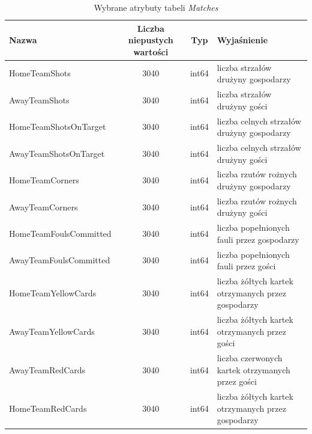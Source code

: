     \begin{table}[H]
    \caption{Wybrane atrybuty tabeli \emph{Matches}}\label{tab:matches}
    \centering\footnotesize%
    \begin{tabular}{l c c l}
    \toprule
        Nazwa & Liczba niepustych wartości & Typ & Wyjaśnienie \\
    \midrule
        HomeTeamShots & 3040 & int64 & liczba strzałów drużyny gospodarzy \\
        AwayTeamShots & 3040 & int64 & liczba strzałów drużyny gości \\
        HomeTeamShotsOnTarget & 3040 & int64 & liczba celnych strzałów drużyny gospodarzy \\
        AwayTeamShotsOnTarget & 3040 & int64 & liczba celnych strzałów drużyny gości \\
        HomeTeamCorners & 3040 & int64 & liczba rzutów rożnych drużyny gospodarzy \\
        AwayTeamCorners & 3040 & int64 & liczba rzutów rożnych drużyny gości \\
        HomeTeamFoulsCommitted & 3040 & int64 & liczba popełnionych fauli przez gospodarzy \\
        AwayTeamFoulsCommitted & 3040 & int64 & liczba popełnionych fauli przez gości \\
        HomeTeamYellowCards & 3040 & int64 & liczba żółtych kartek otrzymanych przez gospodarzy \\
        AwayTeamYellowCards & 3040 & int64 & liczba żółtych kartek otrzymanych przez gości \\
        AwayTeamRedCards & 3040 & int64 & liczba czerwonych kartek otrzymanych przez gości \\
        HomeTeamRedCards & 3040 & int64 & liczba żółtych kartek otrzymanych przez gospodarzy \\
    \bottomrule
    \end{tabular}
    \end{table}

